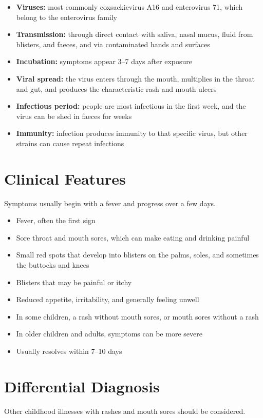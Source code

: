 \begin{itemize}
    \item \textbf{Viruses:} most commonly coxsackievirus A16 and enterovirus 71, which belong to the enterovirus family
    \item \textbf{Transmission:} through direct contact with saliva, nasal mucus, fluid from blisters, and faeces, and via contaminated hands and surfaces
    \item \textbf{Incubation:} symptoms appear 3--7 days after exposure
    \item \textbf{Viral spread:} the virus enters through the mouth, multiplies in the throat and gut, and produces the characteristic rash and mouth ulcers
    \item \textbf{Infectious period:} people are most infectious in the first week, and the virus can be shed in faeces for weeks
    \item \textbf{Immunity:} infection produces immunity to that specific virus, but other strains can cause repeat infections
\end{itemize}

\section*{Clinical Features}
Symptoms usually begin with a fever and progress over a few days.

\begin{itemize}
    \item Fever, often the first sign
    \item Sore throat and mouth sores, which can make eating and drinking painful
    \item Small red spots that develop into blisters on the palms, soles, and sometimes the buttocks and knees
    \item Blisters that may be painful or itchy
    \item Reduced appetite, irritability, and generally feeling unwell
    \item In some children, a rash without mouth sores, or mouth sores without a rash
    \item In older children and adults, symptoms can be more severe
    \item Usually resolves within 7--10 days
\end{itemize}

\section*{Differential Diagnosis}
Other childhood illnesses with rashes and mouth sores should be considered.


